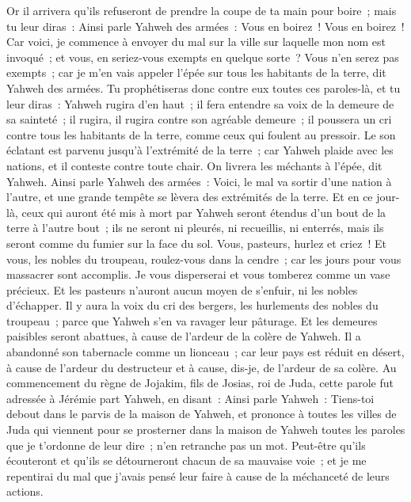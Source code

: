 \begin{multicols}{2}
Or il arrivera qu'ils refuseront de prendre la coupe de ta main pour boire~; mais tu leur diras~: Ainsi parle Yahweh des armées~: Vous en boirez~! Vous en boirez~!
Car voici, je commence à envoyer du mal sur la ville sur laquelle mon nom est invoqué~; et vous, en seriez-vous exempts en quelque sorte~? Vous n'en serez pas exempts~; car je m'en vais appeler l'épée sur tous les habitants de la terre, dit Yahweh des armées.
Tu prophétiseras donc contre eux toutes ces paroles-là, et tu leur diras~: Yahweh rugira d'en haut~; il fera entendre sa voix de la demeure de sa sainteté~; il rugira, il rugira contre son agréable demeure~; il poussera un cri contre tous les habitants de la terre, comme ceux qui foulent au pressoir.
Le son éclatant est parvenu jusqu'à l'extrémité de la terre~; car Yahweh plaide avec les nations, et il conteste contre toute chair. On livrera les méchants à l'épée, dit Yahweh.
Ainsi parle Yahweh des armées~: Voici, le mal va sortir d'une nation à l'autre, et une grande tempête se lèvera des extrémités de la terre.
Et en ce jour-là, ceux qui auront été mis à mort par Yahweh seront étendus d'un bout de la terre à l'autre bout~; ils ne seront ni pleurés, ni recueillis, ni enterrés, mais ils seront comme du fumier sur la face du sol.
Vous, pasteurs, hurlez et criez~! Et vous, les nobles du troupeau, roulez-vous dans la cendre~; car les jours pour vous massacrer sont accomplis. Je vous disperserai et vous tomberez comme un vase précieux.
Et les pasteurs n'auront aucun moyen de s'enfuir, ni les nobles d'échapper. 
Il y aura la voix du cri des bergers, les hurlements des nobles du troupeau~; parce que Yahweh s'en va ravager leur pâturage.
Et les demeures paisibles seront abattues, à cause de l'ardeur de la colère de Yahweh.
Il a abandonné son tabernacle comme un lionceau~; car leur pays est réduit en désert, à cause de l'ardeur du destructeur et à cause, dis-je, de l'ardeur de sa colère.
\VerseOne{}Au commencement du règne de Jojakim, fils de Josias, roi de Juda, cette parole fut adressée à Jérémie part Yahweh, en disant~:
Ainsi parle Yahweh~: Tiens-toi debout dans le parvis de la maison de Yahweh, et prononce à toutes les villes de Juda qui viennent pour se prosterner dans la maison de Yahweh toutes les paroles que je t'ordonne de leur dire~; n'en retranche pas un mot.
Peut-être qu'ils écouteront et qu'ils se détourneront chacun de sa mauvaise voie~; et je me repentirai du mal que j'avais pensé leur faire à cause de la méchanceté de leurs actions.

\end{multicols}
